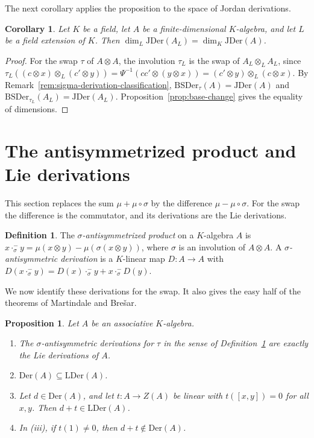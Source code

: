 \documentclass[]{interact}
\theoremstyle{plain}
\newtheorem{corollary}[theorem]{Corollary}
\newtheorem{proposition}[theorem]{Proposition}
\theoremstyle{definition}
\newtheorem{definition}[theorem]{Definition}
\theoremstyle{remark}
\newcommand{\Der}{\mathrm{Der}}
\newcommand{\JDer}{\mathrm{JDer}}
\newcommand{\BSDer}{\mathrm{BSDer}}
\newcommand{\LDer}{\mathrm{LDer}}
\begin{document}
The next corollary applies the proposition to the space of Jordan derivations. %

\begin{corollary}\label{cor:jder-base}
Let $K$ be a field, let $A$ be a finite-dimensional $K$-algebra, and let $L$ be a field extension of $K$.
Then $\dim_L \JDer(A_L) = \dim_K \JDer(A)$.
\end{corollary}

\begin{proof}
For the swap $\tau$ of $A \otimes A$, the involution $\tau_L$ is the swap of $A_L \otimes_L A_L$, since $\tau_L((c \otimes x) \otimes_L (c' \otimes y)) = \Psi^{-1}(cc' \otimes (y \otimes x)) = (c' \otimes y) \otimes_L (c \otimes x)$.
By Remark~\ref{rem:sigma-derivation-classification}, $\BSDer_\tau(A) = \JDer(A)$ and $\BSDer_{\tau_L}(A_L) = \JDer(A_L)$.
Proposition~\ref{prop:base-change} gives the equality of dimensions.
\end{proof}

\section{The antisymmetrized product and Lie derivations}\label{sec:lie}

This section replaces the sum $\mu + \mu \circ \sigma$ by the difference $\mu - \mu \circ \sigma$.
For the swap the difference is the commutator, and its derivations are the Lie derivations.

\begin{definition}\label{def:anti-sigma-derivation} %
The \emph{$\sigma$-antisymmetrized product} on a $K$-algebra $A$ is $x \cdot_\sigma^- y = \mu(x \otimes y) - \mu(\sigma(x \otimes y))$, where $\sigma$ is an involution of $A \otimes A$.
A \emph{$\sigma$-antisymmetric derivation} is a $K$-linear map $D \colon A \to A$ with $D(x \cdot_\sigma^- y) = D(x) \cdot_\sigma^- y + x \cdot_\sigma^- D(y)$.
\end{definition}

We now identify these derivations for the swap.
It also gives the easy half of the theorems of Martindale and Bre\v{s}ar.

\begin{proposition}\label{prop:lie-classification}
Let $A$ be an associative $K$-algebra.
\begin{enumerate}[label=(\roman*)]
\item The $\sigma$-antisymmetric derivations for $\tau$ in the sense of Definition~\ref{def:anti-sigma-derivation} are exactly the Lie derivations of $A$.
\item $\Der(A) \subseteq \LDer(A)$.
\item Let $d \in \Der(A)$, and let $t \colon A \to Z(A)$ be linear with $t([x,y]) = 0$ for all $x, y$. Then $d + t \in \LDer(A)$.
\item In (iii), if $t(1) \neq 0$, then $d + t \notin \Der(A)$.
\end{enumerate}
\end{proposition}
\end{document}
